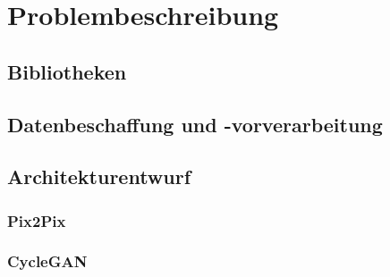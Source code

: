 \chapter{Problembeschreibung}

\section{Bibliotheken}
\section{Datenbeschaffung und -vorverarbeitung}

\section{Architekturentwurf}
\subsection*{Pix2Pix}
\subsection*{CycleGAN}